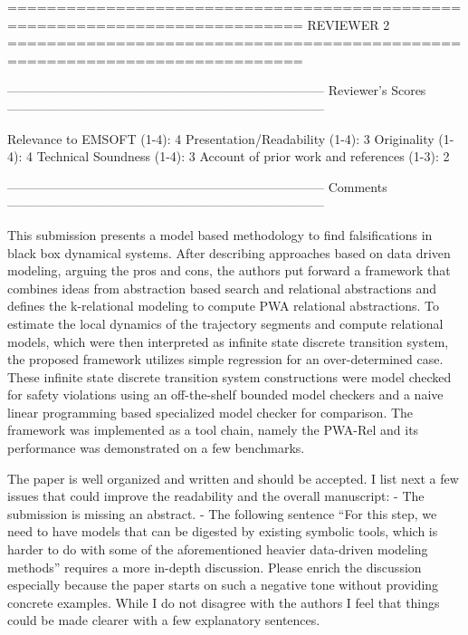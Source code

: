============================================================================
                            REVIEWER 2
============================================================================


---------------------------------------------------------------------------
Reviewer's Scores
---------------------------------------------------------------------------

               Relevance to EMSOFT (1-4): 4
          Presentation/Readability (1-4): 3
                       Originality (1-4): 4
               Technical Soundness (1-4): 3
Account of prior work and references (1-3): 2


---------------------------------------------------------------------------
Comments
---------------------------------------------------------------------------

This submission presents a model based methodology to find falsifications in
black box dynamical systems. After describing approaches based on data driven
modeling, arguing the pros and cons, the authors put forward a framework that
combines ideas from abstraction based search and relational abstractions and
defines the k-relational modeling to compute PWA relational abstractions. To
estimate the local dynamics of the trajectory segments and compute relational
models, which were then interpreted as infinite state discrete transition
system, the proposed framework utilizes simple regression for an
over-determined case. These infinite state discrete transition system
constructions were model checked for safety violations using an off-the-shelf
bounded model checkers and a naive linear programming based specialized model
checker for comparison. The framework was implemented as a tool chain, namely
the PWA-Rel and its performance was demonstrated on a few benchmarks.

The paper is well organized and written and should be accepted. I list next a
few issues that could improve the readability and the overall manuscript:
- The submission is missing an abstract.
-  The following sentence “For this step, we need to have models that can be
digested by existing symbolic tools, which is harder to do with some of the
aforementioned heavier data-driven modeling methods” requires a more in-depth
discussion. Please enrich the discussion especially because the paper starts on
such a negative tone without providing concrete examples. While I do not
disagree with the authors I feel that things could be made clearer with a few
explanatory sentences.

